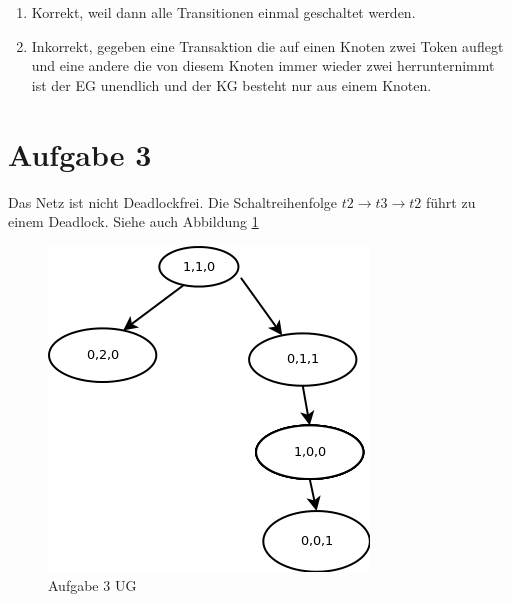 \documentclass[10pt]{scrartcl}
\begin{document}
\begin{enumerate}
	\item Korrekt, weil dann alle Transitionen einmal geschaltet werden.
	
	\item Inkorrekt, gegeben eine Transaktion die auf einen Knoten zwei Token auflegt und eine andere die von diesem Knoten immer wieder zwei herrunternimmt ist der EG unendlich und der KG besteht nur aus einem Knoten.
	
	
\end{enumerate}
\section{Aufgabe 3}
Das Netz ist nicht Deadlockfrei. Die Schaltreihenfolge $t2 \rightarrow t3 \rightarrow t2$ führt zu einem Deadlock. Siehe auch Abbildung \ref{petri:aufg3}
	\begin{figure}[H]
    			\centering
				\includegraphics[scale=0.5]{aufg3.png}		
            	\caption{Aufgabe 3 UG}
            	\label{petri:aufg3}
			\end{figure}
\end{document}
